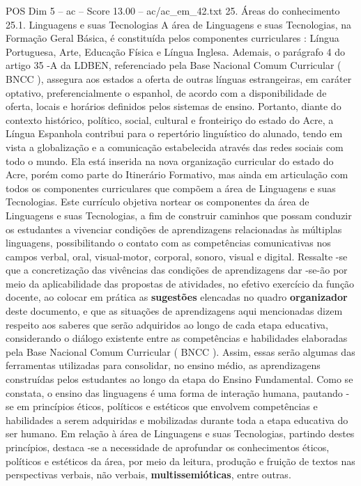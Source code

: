 \begin{textsample}{POS Dim 5 – ac – Score 13.00 – ac/ac\_em\_42.txt}  \label{ex:f5_pos_121}
25.
Áreas do conhecimento 25.1.
Linguagens e suas Tecnologias A área de Linguagens e suas Tecnologias, na Formação Geral Básica, é constituída pelos componentes curriculares : Língua Portuguesa, Arte, Educação Física e Língua Inglesa.
Ademais, o parágrafo 4 do artigo 35 -A da LDBEN, referenciado pela Base Nacional Comum Curricular ( BNCC ), assegura aos estados a oferta de outras línguas estrangeiras, em caráter optativo, preferencialmente o espanhol, de acordo com a disponibilidade de oferta, locais e horários definidos pelos sistemas de ensino.
Portanto, diante do contexto histórico, político, social, cultural e fronteiriço do estado do Acre, a Língua Espanhola contribui para o repertório linguístico do alunado, tendo em vista a globalização e a comunicação estabelecida através das redes sociais com todo o mundo.
Ela está inserida na nova organização curricular do estado do Acre, porém como parte do Itinerário Formativo, mas ainda em articulação com todos os componentes curriculares que compõem a área de Linguagens e suas Tecnologias.
Este currículo objetiva nortear os componentes da área de Linguagens e suas Tecnologias, a fim de construir caminhos que possam conduzir os estudantes a vivenciar condições de aprendizagens relacionadas às múltiplas linguagens, possibilitando o contato com as competências comunicativas nos campos verbal, oral, visual-motor, corporal, sonoro, visual e digital.
Ressalte -se que a concretização das vivências das condições de aprendizagens dar -se-ão por meio da aplicabilidade das propostas de atividades, no efetivo exercício da função docente, ao colocar em prática as \textbf{sugestões} elencadas no quadro \textbf{organizador} deste documento, e que as situações de aprendizagens aqui mencionadas dizem respeito aos saberes que serão adquiridos ao longo de cada etapa educativa, considerando o diálogo existente entre as competências e habilidades elaboradas pela Base Nacional Comum Curricular ( BNCC ).
Assim, essas serão algumas das ferramentas utilizadas para consolidar, no ensino médio, as aprendizagens construídas pelos estudantes ao longo da etapa do Ensino Fundamental.
Como se constata, o ensino das linguagens é uma forma de interação humana, pautando -se em princípios éticos, políticos e estéticos que envolvem competências e habilidades a serem adquiridas e mobilizadas durante toda a etapa educativa do ser humano.
Em relação à área de Linguagens e suas Tecnologias, partindo destes princípios, destaca -se a necessidade de aprofundar os conhecimentos éticos, políticos e estéticos da área, por meio da leitura, produção e fruição de textos nas perspectivas verbais, não verbais, \textbf{multissemióticas}, entre outras.

\end{textsample}
